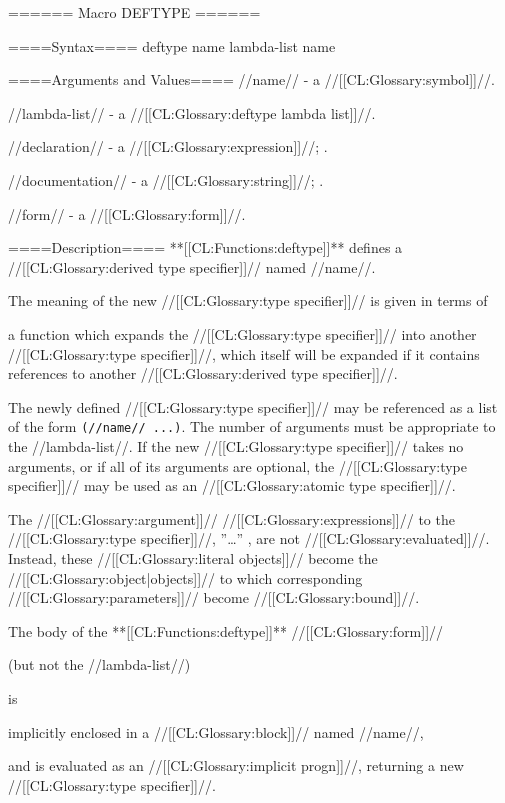 ====== Macro DEFTYPE ======

====Syntax====
\DefmacWithValues deftype {name lambda-list {\DeclsAndDoc} } {name}

====Arguments and Values====
//name// - a //[[CL:Glossary:symbol]]//.

//lambda-list// - a //[[CL:Glossary:deftype lambda list]]//.

//declaration// - a  //[[CL:Glossary:expression]]//; \noeval.

//documentation// - a //[[CL:Glossary:string]]//; \noeval.

//form// - a //[[CL:Glossary:form]]//.

====Description====
**[[CL:Functions:deftype]]** defines a //[[CL:Glossary:derived type specifier]]// named //name//.

The meaning of the new //[[CL:Glossary:type specifier]]// is given in terms of

a function which expands the //[[CL:Glossary:type specifier]]// into another //[[CL:Glossary:type specifier]]//, which itself will be expanded if it contains references to another //[[CL:Glossary:derived type specifier]]//.

The newly defined //[[CL:Glossary:type specifier]]// may be referenced as a list of the form {\tt (//name//   ...)\/}. The number of arguments must be appropriate to the //lambda-list//. If the new //[[CL:Glossary:type specifier]]// takes no arguments, or if all of its arguments are optional, the //[[CL:Glossary:type specifier]]// may be used as an //[[CL:Glossary:atomic type specifier]]//.

The //[[CL:Glossary:argument]]// //[[CL:Glossary:expressions]]// to the //[[CL:Glossary:type specifier]]//,  ''\ldots'' , are not //[[CL:Glossary:evaluated]]//. Instead, these //[[CL:Glossary:literal objects]]// become the //[[CL:Glossary:object|objects]]// to which corresponding //[[CL:Glossary:parameters]]// become //[[CL:Glossary:bound]]//.

The body of the **[[CL:Functions:deftype]]** //[[CL:Glossary:form]]//

(but not the //lambda-list//)

is

implicitly enclosed in a //[[CL:Glossary:block]]// named //name//,

and is evaluated as an //[[CL:Glossary:implicit progn]]//, returning a new //[[CL:Glossary:type specifier]]//.


